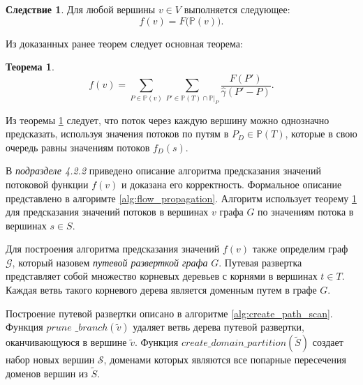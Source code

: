 \documentclass[14pt,autoref,href]{disser}
\theoremstyle{definition}
\newtheorem{theorem}{Теорема}
\newtheorem{corollary}{Следствие}
\begin{document}
\begin{corollary}
Для любой вершины $v \in V$ выполняется следующее:
\begin{equation}
    f(v) = F\big(\mathbb{P}(v)\big).
\end{equation}
\end{corollary}

Из доказанных ранее теорем следует основная теорема:

\begin{theorem} \label{th:flow_decomposition}
\begin{equation} \label{eq:flow_decomposition}
    f(v) = \sum_{P\in \mathbb{P}(v)}{ \sum_{P'\in \mathbb{P}(T)\cap \mathbb{P}|_P}{ \frac{F(P')}{\hat{\gamma}(P'-P)} } }.
\end{equation}
\end{theorem}

Из теоремы \ref{th:flow_decomposition} следует, что поток через каждую вершину можно однозначно предсказать, используя значения потоков по путям в $P_D\in \mathbb{P}(T)$, которые в свою очередь равны значениям потоков $f_D(s)$.

В \emph{подразделе 4.2.2} приведено описание алгоритма предсказания значений потоковой функции $f(v)$ и доказана его корректность.
Формальное описание представлено в алгоримте \ref{alg:flow_propagation}.
Алгоритм использует теорему \ref{th:flow_decomposition} для предсказания значений потоков в вершинах $v$ графа $G$ по значениям потока в вершинах $s\in S$.

Для построения алгоритма предсказания значений $f(v)$ также определим граф $\mathcal{G}$, который назовем  \textit{путевой разверткой графа} $G$.
Путевая развертка представляет собой множество корневых деревьев с корнями в вершинах $t\in T$.
Каждая ветвь такого корневого дерева является доменным путем в графе $G$.

Построение путевой развертки описано в алгоритме \ref{alg:create_path_scan}.
Функция $prune$ $\_branch(\tilde{v})$ удаляет ветвь дерева путевой развертки, оканчивающуюся в вершине $\tilde{v}$.
Функция $create\_domain\_partition(\widetilde{S})$ создает набор новых вершин $\mathscr{S}$, доменами которых являются все попарные пересечения доменов вершин из $\widetilde{S}$.
\end{document}
